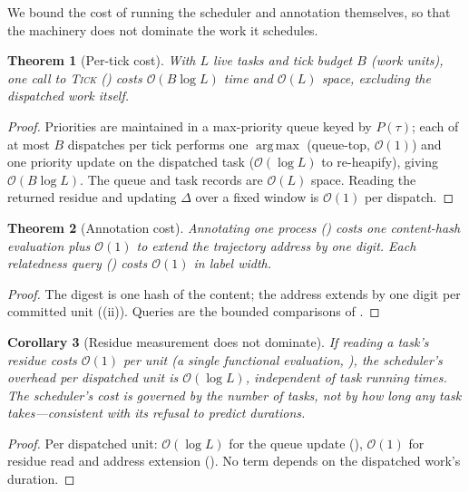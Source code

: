 \documentclass[twocolumn,10pt,a4paper]{article}
\theoremstyle{thmstyle}
\newtheorem{theorem}{Theorem}[section]
\newtheorem{corollary}[theorem]{Corollary}
\theoremstyle{definition}
\theoremstyle{remark}
\newcommand{\task}{\tau}
\DeclareMathOperator*{\argmax}{arg\,max}
\begin{document}
We bound the cost of running the scheduler and annotation themselves, so
that the machinery does not dominate the work it schedules.

\begin{theorem}[Per-tick cost]
\label{thm:pertick}
With $L$ live tasks and tick budget $B$ (work units), one call to
\textsc{Tick} () costs
$\mathcal{O}(B\log L)$ time and $\mathcal{O}(L)$ space, excluding the
dispatched work itself.
\end{theorem}

\begin{proof}
Priorities are maintained in a max-priority queue keyed by $P(\task)$;
each of at most $B$ dispatches per tick performs one $\argmax$
(queue-top, $\mathcal{O}(1)$) and one priority update on the dispatched
task ($\mathcal{O}(\log L)$ to re-heapify), giving $\mathcal{O}(B\log L)$.
The queue and task records are $\mathcal{O}(L)$ space. Reading the
returned residue and updating $\Delta$ over a fixed window is
$\mathcal{O}(1)$ per dispatch.
\end{proof}

\begin{theorem}[Annotation cost]
\label{thm:annot-cost}
Annotating one process () costs one content-hash
evaluation plus $\mathcal{O}(1)$ to extend the trajectory address by one
digit. Each relatedness query () costs $\mathcal{O}(1)$
in label width.
\end{theorem}

\begin{proof}
The digest is one hash of the content; the address extends by one digit
per committed unit ((ii)). Queries are the bounded
comparisons of .
\end{proof}

\begin{corollary}[Residue measurement does not dominate]
\label{cor:nondominate}
If reading a task's residue costs $\mathcal{O}(1)$ per unit (a single
functional evaluation, ), the scheduler's overhead per
dispatched unit is $\mathcal{O}(\log L)$, independent of task running
times. The scheduler's cost is governed by the number of tasks, not by
how long any task takes---consistent with its refusal to predict
durations.
\end{corollary}

\begin{proof}
Per dispatched unit: $\mathcal{O}(\log L)$ for the queue update
(), $\mathcal{O}(1)$ for residue read and address
extension (). No term depends on the dispatched
work's duration.
\end{proof}
\end{document}
